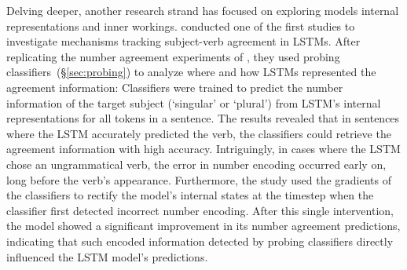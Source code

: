 Delving deeper, another research strand has focused on exploring models internal representations and inner workings. \cite{giulianelli-etal-2018-hood} conducted one of the first studies to investigate mechanisms tracking subject-verb agreement in LSTMs. After replicating the number agreement experiments of \cite{gulordava-etal-2018-colorless}, they used probing classifiers~(\S\ref{sec:probing}) to analyze where and how LSTMs represented the agreement information:
Classifiers were trained to predict the number information of the target subject (`singular' or `plural') from LSTM's internal representations for all tokens in a sentence. The results revealed that in sentences where the LSTM accurately predicted the verb, the classifiers could retrieve the agreement
information with high accuracy. Intriguingly, in cases where the LSTM chose an ungrammatical verb, the error in number encoding occurred early on, long before the verb's appearance. Furthermore, the study used the gradients of the classifiers to rectify the model's internal states at the timestep when the classifier first detected incorrect number encoding. After this single intervention, the model showed a significant improvement in its number agreement predictions, indicating that such encoded information detected by probing classifiers directly influenced the LSTM model's predictions. 

